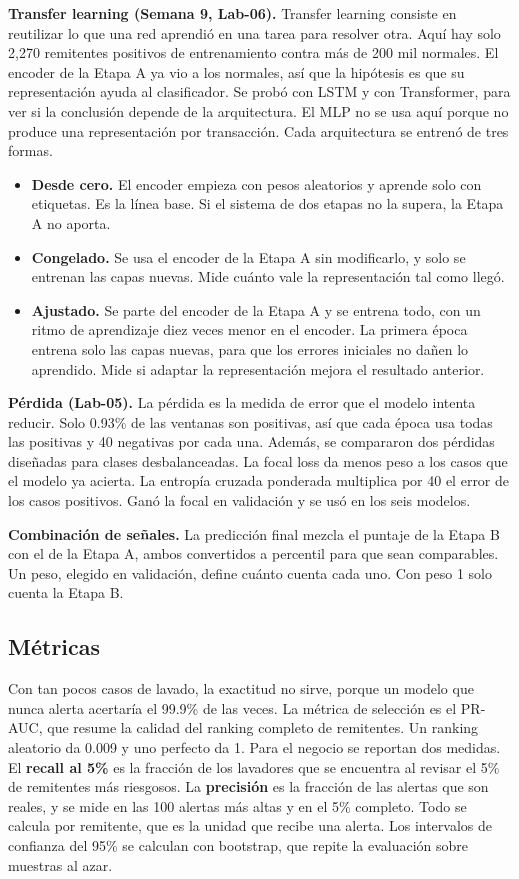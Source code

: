 \documentclass[11pt]{article}
\begin{document}
\textbf{Transfer learning (Semana 9, Lab-06).} Transfer learning consiste en reutilizar lo que una red aprendió en una tarea para resolver otra. Aquí hay solo 2,270 remitentes positivos de entrenamiento contra más de 200 mil normales. El encoder de la Etapa A ya vio a los normales, así que la hipótesis es que su representación ayuda al clasificador. Se probó con LSTM y con Transformer, para ver si la conclusión depende de la arquitectura. El MLP no se usa aquí porque no produce una representación por transacción. Cada arquitectura se entrenó de tres formas.
\begin{itemize}
  \item \textbf{Desde cero.} El encoder empieza con pesos aleatorios y aprende solo con etiquetas. Es la línea base. Si el sistema de dos etapas no la supera, la Etapa A no aporta.
  \item \textbf{Congelado.} Se usa el encoder de la Etapa A sin modificarlo, y solo se entrenan las capas nuevas. Mide cuánto vale la representación tal como llegó.
  \item \textbf{Ajustado.} Se parte del encoder de la Etapa A y se entrena todo, con un ritmo de aprendizaje diez veces menor en el encoder. La primera época entrena solo las capas nuevas, para que los errores iniciales no dañen lo aprendido. Mide si adaptar la representación mejora el resultado anterior.
\end{itemize}

\textbf{Pérdida (Lab-05).} La pérdida es la medida de error que el modelo intenta reducir. Solo 0.93\% de las ventanas son positivas, así que cada época usa todas las positivas y 40 negativas por cada una. Además, se compararon dos pérdidas diseñadas para clases desbalanceadas. La focal loss \cite{lin2017} da menos peso a los casos que el modelo ya acierta. La entropía cruzada ponderada multiplica por 40 el error de los casos positivos. Ganó la focal en validación y se usó en los seis modelos.

\textbf{Combinación de señales.} La predicción final mezcla el puntaje de la Etapa B con el de la Etapa A, ambos convertidos a percentil para que sean comparables. Un peso, elegido en validación, define cuánto cuenta cada uno. Con peso 1 solo cuenta la Etapa B.

\subsection{Métricas}

Con tan pocos casos de lavado, la exactitud no sirve, porque un modelo que nunca alerta acertaría el 99.9\% de las veces. La métrica de selección es el PR-AUC, que resume la calidad del ranking completo de remitentes. Un ranking aleatorio da 0.009 y uno perfecto da 1. Para el negocio se reportan dos medidas. El \textbf{recall al 5\%} es la fracción de los lavadores que se encuentra al revisar el 5\% de remitentes más riesgosos. La \textbf{precisión} es la fracción de las alertas que son reales, y se mide en las 100 alertas más altas y en el 5\% completo. Todo se calcula por remitente, que es la unidad que recibe una alerta. Los intervalos de confianza del 95\% se calculan con bootstrap, que repite la evaluación sobre muestras al azar.
\end{document}
